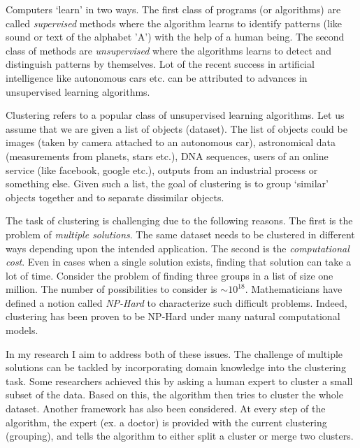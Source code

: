 \documentclass[12pt]{article}
\begin{document}
\linespread{0.901}

Computers `learn' in two ways. The first class of programs (or algorithms) are called \textit{supervised} methods where the algorithm learns to identify patterns (like sound or text of the alphabet 'A') with the help of a human being.  The second class of methods are \textit{unsupervised} where the algorithms learns to detect and distinguish patterns by themselves. Lot of the recent success in artificial intelligence like autonomous cars etc. can be attributed to advances in unsupervised learning algorithms. 

Clustering refers to a popular class of unsupervised learning algorithms. Let us assume that we are given a list of objects (dataset). The list of objects could be images (taken by camera attached to an autonomous car), astronomical data (measurements from planets, stars etc.), DNA sequences, users of an online service (like facebook, google etc.), outputs from an industrial process or something else. Given such a list, the goal of clustering is to group `similar' objects together and to separate dissimilar objects. 

The task of clustering is challenging due to the following reasons. The first is the problem of \textit{multiple solutions}. The same dataset needs to be clustered in different ways depending upon the intended application. The second is the \textit{computational cost}. Even in cases when a single solution exists, finding that solution can take a lot of time. Consider the problem of finding three groups in a list of size one million. The number of possibilities to consider is $\sim 10^{18}$. Mathematicians have defined a notion called \textit{NP-Hard} to characterize such difficult problems. Indeed, clustering has been proven to be NP-Hard under many natural computational models.

In my research I aim to address both of these issues. The challenge of multiple solutions can be tackled by incorporating domain knowledge into the clustering task. Some researchers achieved this by asking a human expert to cluster a small subset of the data. Based on this, the algorithm then tries to cluster the whole dataset.  Another framework has also been considered. At every step of the algorithm, the expert (ex. a doctor) is provided with the current clustering (grouping), and tells the algorithm to either split a cluster or merge two clusters. 
\end{document}
